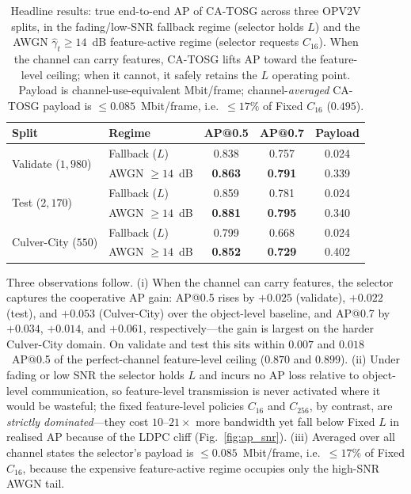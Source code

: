 \documentclass[journal]{IEEEtran}
\newcommand{\method}{CA-TOSG}
\begin{document}
\begin{table}[t]
\centering
\caption{Headline results: true end-to-end AP of \method{} across three OPV2V splits, in the fading/low-SNR fallback regime (selector holds $L$) and the AWGN $\hat\gamma_t\ge14$~dB feature-active regime (selector requests $C_{16}$). When the channel can carry features, \method{} lifts AP toward the feature-level ceiling; when it cannot, it safely retains the $L$ operating point. Payload is channel-use-equivalent Mbit/frame; channel-\emph{averaged} \method{} payload is $\le0.085$~Mbit/frame, i.e.\ $\le17\%$ of Fixed $C_{16}$ ($0.495$).}
\label{tab:headline}
\begin{tabular}{llccc}
\toprule
Split & Regime & AP@0.5 & AP@0.7 & Payload \\
\midrule
\multirow{2}{*}{Validate ($1{,}980$)}
  & Fallback ($L$)  & 0.838 & 0.757 & 0.024 \\
  & AWGN $\ge14$~dB & \textbf{0.863} & \textbf{0.791} & 0.339 \\
\midrule
\multirow{2}{*}{Test ($2{,}170$)}
  & Fallback ($L$)  & 0.859 & 0.781 & 0.024 \\
  & AWGN $\ge14$~dB & \textbf{0.881} & \textbf{0.795} & 0.340 \\
\midrule
\multirow{2}{*}{Culver-City ($550$)}
  & Fallback ($L$)  & 0.799 & 0.668 & 0.024 \\
  & AWGN $\ge14$~dB & \textbf{0.852} & \textbf{0.729} & 0.402 \\
\bottomrule
\end{tabular}
\end{table}

Three observations follow. (i) When the channel can carry features, the selector captures the cooperative AP gain: AP@0.5 rises by $+0.025$ (validate), $+0.022$ (test), and $+0.053$ (Culver-City) over the object-level baseline, and AP@0.7 by $+0.034$, $+0.014$, and $+0.061$, respectively---the gain is largest on the harder Culver-City domain. On validate and test this sits within $0.007$ and $0.018$~AP@0.5 of the perfect-channel feature-level ceiling ($0.870$ and $0.899$). (ii) Under fading or low SNR the selector holds $L$ and incurs no AP loss relative to object-level communication, so feature-level transmission is never activated where it would be wasteful; the fixed feature-level policies $C_{16}$ and $C_{256}$, by contrast, are \emph{strictly dominated}---they cost $10\text{--}21\times$ more bandwidth yet fall below Fixed $L$ in realised AP because of the LDPC cliff (Fig.~\ref{fig:ap_snr}). (iii) Averaged over all channel states the selector's payload is $\le0.085$~Mbit/frame, i.e.\ $\le17\%$ of Fixed $C_{16}$, because the expensive feature-active regime occupies only the high-SNR AWGN tail.
\end{document}
